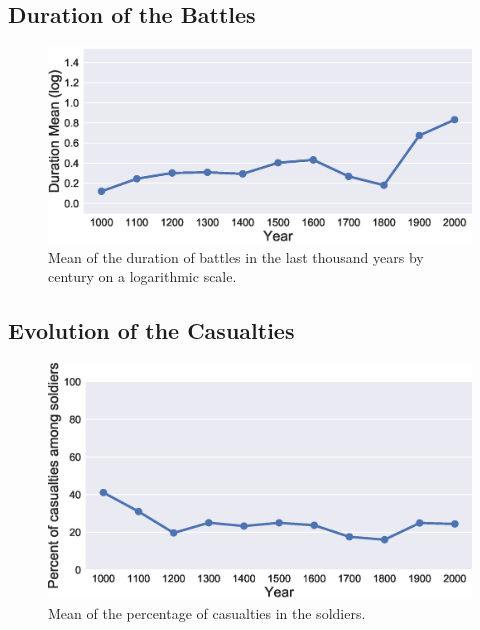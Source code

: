\subsection{Duration of the Battles}

 \begin{figure}[h]
	\centering	\includegraphics[width=\linewidth]{figures/durThByCent}
	\caption{Mean of the duration of battles in the last thousand years by century on a logarithmic scale.}\label{fig:durThByCent}
	\centering
\end{figure}

\subsection{Evolution of the Casualties}

 \begin{figure}[h]
	\centering	\includegraphics[width=\linewidth]{figures/casuPerCent}
	\caption{Mean of the percentage of casualties in the soldiers.}\label{fig:casuPerCent}
	\centering
\end{figure}

